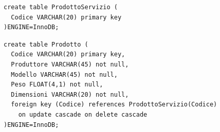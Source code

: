 \noindent{}
\newline\newline

\begin{verbatim}
create table ProdottoServizio (
  Codice VARCHAR(20) primary key
)ENGINE=InnoDB;
\end{verbatim}
\vspace{0.5cm}

\noindent{}
\newline\newline

\begin{verbatim}
create table Prodotto (
  Codice VARCHAR(20) primary key,
  Produttore VARCHAR(45) not null,
  Modello VARCHAR(45) not null,
  Peso FLOAT(4,1) not null,
  Dimensioni VARCHAR(20) not null,
  foreign key (Codice) references ProdottoServizio(Codice)
    on update cascade on delete cascade
)ENGINE=InnoDB;
\end{verbatim}
\vspace{0.5cm}

\noindent{}
\newline\newline

